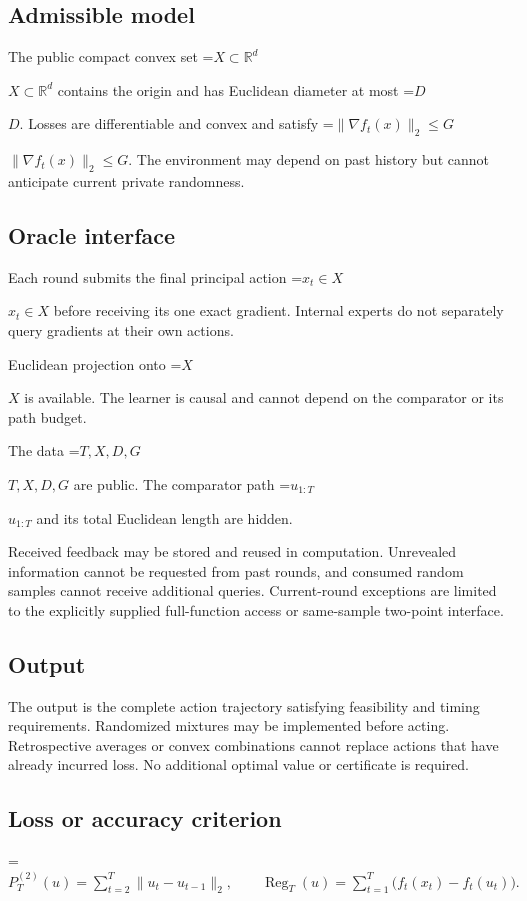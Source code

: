 \documentclass[10pt,a4paper]{article}
\newcommand{\AtlasMath}[1]{\par\begingroup\centering\setbox0=\hbox{$\displaystyle #1$}\ifdim\wd0>1.4\linewidth\typeout{ATLAS WIDE FORMULA: \the\wd0}\fi\ifdim\wd0>\linewidth\resizebox{\linewidth}{!}{\box0}\else\box0\fi\par\endgroup}
\newcommand{\AtlasInlineMath}[1]{\begingroup\setbox0=\hbox{$#1$}\ifdim\wd0>.4\linewidth\endgroup\AtlasMath{#1}\else\endgroup$#1$\fi}
\begin{document}
\subsection{Admissible model}
The public compact convex set \AtlasInlineMath{X\subset\mathbb{R}^d} contains the origin and has Euclidean diameter at most \AtlasInlineMath{D}. Losses are differentiable and convex and satisfy \AtlasInlineMath{\|\nabla f_t(x)\|_2\le G}. The environment may depend on past history but cannot anticipate current private randomness.

\subsection{Oracle interface}
Each round submits the final principal action \AtlasInlineMath{x_t\in X} before receiving its one exact gradient. Internal experts do not separately query gradients at their own actions.

Euclidean projection onto \AtlasInlineMath{X} is available. The learner is causal and cannot depend on the comparator or its path budget.

The data \AtlasInlineMath{T,X,D,G} are public. The comparator path \AtlasInlineMath{u_{1:T}} and its total Euclidean length are hidden.

Received feedback may be stored and reused in computation. Unrevealed information cannot be requested from past rounds, and consumed random samples cannot receive additional queries. Current-round exceptions are limited to the explicitly supplied full-function access or same-sample two-point interface.

\subsection{Output}
The output is the complete action trajectory satisfying feasibility and timing requirements. Randomized mixtures may be implemented before acting. Retrospective averages or convex combinations cannot replace actions that have already incurred loss. No additional optimal value or certificate is required.

\subsection{Loss or accuracy criterion}

\AtlasMath{P_T^{(2)}(u)=\sum_{t=2}^{T}\|u_t-u_{t-1}\|_2,\qquad \operatorname{Reg}_T(u)=\sum_{t=1}^{T}\bigl(f_t(x_t)-f_t(u_t)\bigr).}
\end{document}
